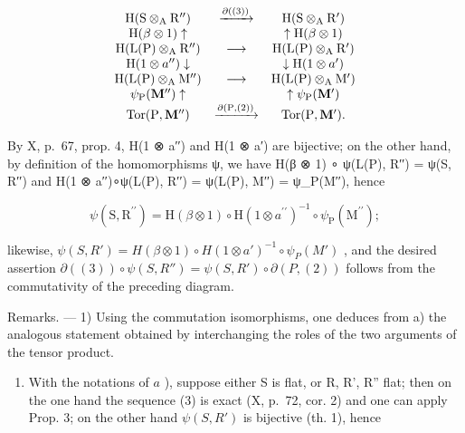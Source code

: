 \[
\begin{array}{c c c} \mathrm{H} (\mathrm{S} \otimes_ {\mathrm{A}} \mathrm{R} ^ {\prime \prime}) & \xrightarrow {\partial ((3))} & \mathrm{H} (\mathrm{S} \otimes_ {\mathrm{A}} \mathrm{R} ^ {\prime}) \\ \mathrm{H} (\beta \otimes 1) \uparrow & & \uparrow \mathrm{H} (\beta \otimes 1) \\ \mathrm{H} (\mathrm{L} (\mathrm{P}) \otimes_ {\mathrm{A}} \mathrm{R} ^ {\prime \prime}) & \longrightarrow & \mathrm{H} (\mathrm{L} (\mathrm{P}) \otimes_ {\mathrm{A}} \mathrm{R} ^ {\prime}) \\ \mathrm{H} (1 \otimes a ^ {\prime \prime}) \downarrow & & \downarrow \mathrm{H} (1 \otimes a ^ {\prime}) \\ \mathrm{H} (\mathrm{L} (\mathrm{P}) \otimes_ {\mathrm{A}} \mathrm{M} ^ {\prime \prime}) & \longrightarrow & \mathrm{H} (\mathrm{L} (\mathrm{P}) \otimes_ {\mathrm{A}} \mathrm{M} ^ {\prime}) \\ \psi_ {\mathrm{P}} (\mathbf {M} ^ {\prime \prime}) \uparrow & & \uparrow \psi_ {\mathrm{P}} (\mathbf {M} ^ {\prime}) \\ \operatorname{Tor} (\mathrm{P}, \mathbf {M} ^ {\prime \prime}) & \xrightarrow {\partial (\mathrm{P} , (2))} & \operatorname{Tor} (\mathrm{P}, \mathbf {M} ^ {\prime}). \end{array}
\]

By X, p.~67, prop. 4, H(1 ⊗ a′′) and H(1 ⊗ a′) are bijective; on the other hand, by definition of the homomorphisms ψ, we have H(β ⊗ 1) ∘ ψ(L(P), R′′) = ψ(S, R′′) and H(1 ⊗ a′′)∘ψ(L(P), R′′) = ψ(L(P), M′′) = ψ\_P(M′′), hence

\[
\psi (\mathrm{S}, \mathrm{R} ^ {\prime \prime}) = \mathrm{H} (\beta \otimes 1) \circ \mathrm{H} (1 \otimes a ^ {\prime \prime}) ^ {- 1} \circ \psi_ {\mathrm{P}} (\mathrm{M} ^ {\prime \prime});
\]

likewise, \(\psi(S, R') = H(\beta \otimes 1) \circ H(1 \otimes a')^{-1} \circ \psi_P(M')\) , and the desired assertion \(\partial((3)) \circ \psi(S, R'') = \psi(S, R') \circ \partial(P, (2))\) follows from the commutativity of the preceding diagram.

Remarks. --- 1) Using the commutation isomorphisms, one deduces from a) the analogous statement obtained by interchanging the roles of the two arguments of the tensor product.

\begin{enumerate}
\def\labelenumi{\arabic{enumi})}
\setcounter{enumi}{1}
\tightlist
\item
  With the notations of \(a\) ), suppose either S is flat, or R, R', R'' flat; then on the one hand the sequence (3) is exact (X, p.~72, cor. 2) and one can apply Prop. 3; on the other hand \(\psi(S, R')\) is bijective (th. 1), hence
\end{enumerate}

